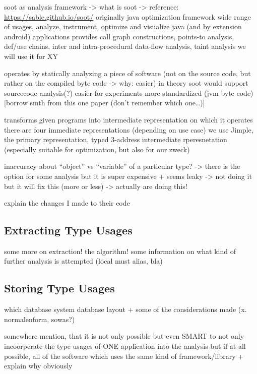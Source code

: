 soot as analysis framework -> what is soot
-> reference: \url{https://sable.github.io/soot/}
originally java optimization framework
wide range of usages, analyze, instrument, optimize and visualize java (and by extension android) applications
provides call graph constructions, points-to analysis, def/use chains, inter and intra-procedural data-flow analysis,
taint analysis
we will use it for XY

operates by statically analyzing a piece of software
(not on the source code, but rather on the compiled byte code -> why: easier)
in theory soot would support sourcecode analysis(?)
easier for experiments
more standardized (jvm byte code)
[borrow smth from this one paper (don't remember which one\ldots)]

transforms given programs into intermediate representation on which it operates
there are four immediate representations (depending on use case)
we use Jimple, the primary representation, typed 3-address intermediate rperesnetation (especially suitable for optimization, but also for our zweck)

inaccuracy about ``object'' vs ``variable'' of a particular type?
-> there is the option for some analysis but it is super  expensive + seems leaky -> not doing it
but it will fix this (more or less)
-> actually are doing this!

explain the changes I made to their code

\subsection{Extracting Type Usages}

some more on extraction!
the algorithm!
some information on what kind of further analysis is attempted (local must alias, bla)

\subsection{Storing Type Usages}

which database system
database layout + some of the considerations made (x. normalenform, sowas?)

somewhere mention, that it is not only possible but even SMART to not only incoorperate the type usages of ONE application into the analysis but if at all possible, all of the software which uses the same kind of framework/library
+ explain why obviously

